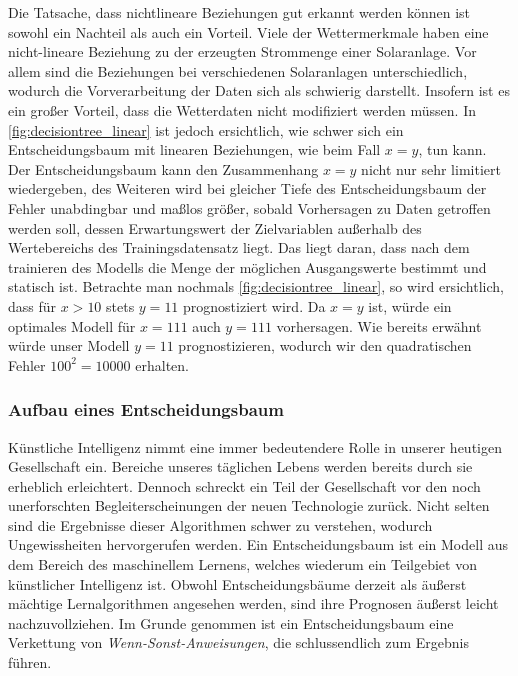 \documentclass[12pt, a4paper]{article}
\begin{document}
Die Tatsache, dass nichtlineare Beziehungen gut erkannt werden können ist sowohl ein Nachteil als auch ein Vorteil. Viele der Wettermerkmale haben eine nicht-lineare Beziehung zu der erzeugten Strommenge einer Solaranlage. Vor allem sind die Beziehungen bei verschiedenen Solaranlagen unterschiedlich, wodurch die Vorverarbeitung der Daten sich als schwierig darstellt. Insofern ist es ein großer Vorteil, dass die Wetterdaten nicht modifiziert werden müssen. In \autoref{fig:decisiontree_linear} ist jedoch ersichtlich, wie schwer sich ein Entscheidungsbaum mit linearen Beziehungen, wie beim Fall $x=y$, tun kann. Der Entscheidungsbaum kann den Zusammenhang $x=y$ nicht nur sehr limitiert wiedergeben, des Weiteren wird bei gleicher Tiefe des Entscheidungsbaum der Fehler  unabdingbar und maßlos größer, sobald Vorhersagen zu Daten getroffen werden soll, dessen Erwartungswert der Zielvariablen außerhalb des Wertebereichs des Trainingsdatensatz liegt. Das liegt daran, dass nach dem trainieren des Modells die Menge der möglichen Ausgangswerte bestimmt und statisch ist. Betrachte man nochmals \autoref{fig:decisiontree_linear}, so wird ersichtlich, dass für $x>10$ stets $y=11$ prognostiziert wird. Da $x=y$ ist, würde ein optimales Modell für $x=111$ auch $y=111$ vorhersagen. Wie bereits erwähnt würde unser Modell $y=11$ prognostizieren, wodurch wir den quadratischen Fehler $100^{2}=10000$ erhalten. 

\subsubsection{Aufbau eines Entscheidungsbaum}
\label{subsubsec:decisiontree_structure}

Künstliche Intelligenz nimmt eine immer bedeutendere Rolle in unserer heutigen Gesellschaft ein. Bereiche unseres täglichen Lebens werden bereits durch sie erheblich erleichtert. Dennoch schreckt ein Teil der Gesellschaft vor den noch unerforschten Begleiterscheinungen der neuen Technologie zurück. Nicht selten sind die Ergebnisse dieser Algorithmen schwer zu verstehen, wodurch Ungewissheiten hervorgerufen werden. 
Ein Entscheidungsbaum ist ein Modell aus dem Bereich des maschinellem Lernens, welches wiederum ein Teilgebiet von künstlicher Intelligenz ist. Obwohl Entscheidungsbäume derzeit als äußerst mächtige Lernalgorithmen angesehen werden, sind ihre Prognosen äußerst leicht nachzuvollziehen. Im Grunde genommen ist ein Entscheidungsbaum eine Verkettung von \textit{Wenn-Sonst-Anweisungen}, die schlussendlich zum Ergebnis führen. 
\end{document}
